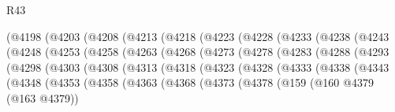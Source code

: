 \begin{lexlean}{R43}
\begin{coremodule}
                (@4198
                  (@4203
                    (@4208
                      (@4213
                        (@4218
                          (@4223
                            (@4228
                              (@4233
                                (@4238
                                  (@4243
                                    (@4248
                                      (@4253
                                        (@4258
                                          (@4263
                                            (@4268
                                              (@4273
                                                (@4278
                                                  (@4283
                                                    (@4288
                                                      (@4293
                                                        (@4298
                                                          (@4303
                                                            (@4308
                                                              (@4313
                                                                (@4318
                                                                  (@4323
                                                                    (@4328
                                                                      (@4333
                                                                        (@4338
                                                                          (@4343
                                                                            (@4348
                                                                              (@4353
                                                                                (@4358
                                                                                  (@4363
                                                                                    (@4368
                                                                                      (@4373
                                                                                        (@4378
                                                                                          (@159
                                                                                            (@160
                                                                                              @4379
                                                                                              (@163
                                                                                                @4379))

\end{coremodule}
\end{lexlean}

